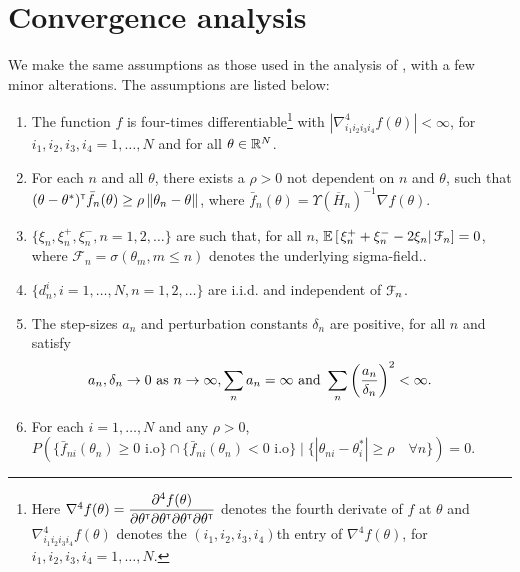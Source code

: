 \section{Convergence analysis}
\label{sec:2rdsa-results}
We make the same assumptions as those used in the analysis of \cite{prashanth2015rdsa}, with a few minor alterations. The assumptions are listed below:
\begin{enumerate}[label=(\textbf{A\arabic*}),resume]
\item  The function
$f$ is four-times differentiable\footnote{Here $\nabla^4 f(\theta) = \dfrac{\partial^4 f (\theta)}{\partial \theta^\mathsf{\scriptscriptstyle T} \partial \theta^\mathsf{\scriptscriptstyle T} \partial \theta^\mathsf{\scriptscriptstyle T} \partial \theta^\mathsf{\scriptscriptstyle T}}$ denotes the fourth derivate of $f$ at $\theta$ and $\nabla^4_{i_1 i_2 i_3 i_4} f(\theta)$ denotes the $(i_1, i_2, i_3, i_4)$th entry of $\nabla^4 f(\theta)$, for $i_1, i_2, i_3,i_4=1,\ldots, N$.} with $\left|\nabla^4_{i_1 i_2 i_3 i_4} f(\theta) \right| < \infty$, for $i_1, i_2, i_3,i_4=1,\ldots, N$ and for all $\theta\in \mathbb{R}^N$. 


\item For each $n$ and all $\theta$, there exists a $\rho>0$ not dependent on $n$ and $\theta$, such that $(\theta-\theta^*)^\mathsf{\scriptscriptstyle T} \bar f_n(\theta) \ge \rho \left\| \theta_n - \theta\right\|$, where $\bar f_n(\theta) = \Upsilon(\overline H_n)^{-1} \nabla f(\theta)$.

\item $\{\xi_n, \xi_n^+,\xi_n^-, n=1,2,\ldots\}$ are such that, for all $n$, $\mathbb{E}\left[\left. \xi_n^+ + \xi_n^- - 2 \xi_n \right| \mathcal{F}_n\right] = 0$, where $\mathcal{F}_n = \sigma(\theta_m,m\le n)$ denotes the underlying sigma-field.. 

\item $\{d_n^i, i=1,\ldots,N, n=1,2,\ldots\}$ are i.i.d. and independent of $\mathcal{F}_n$.

\item  The step-sizes $a_n$ and perturbation constants $\delta_n$ are positive, for all $n$ and satisfy
$$\hspace{-1.7em} a_n, \delta_n \rightarrow 0\text{ as } n \rightarrow \infty, 
\sum_n a_n=\infty \text{ and } \sum_n \left(\frac{a_n}{\delta_n}\right)^2 <\infty.$$

\item For each $i=1,\ldots,N$ and any $\rho>0$, 
$P(\{ \bar f_{ni} (\theta_n) \ge 0 \text{ i.o}\} \cap \{ \bar f_{ni} (\theta_n) < 0 \text{ i.o}\} \mid \{ |\theta_{ni} - \theta^*_i| \ge \rho\quad \forall n\}) =0.$


\end{enumerate}
